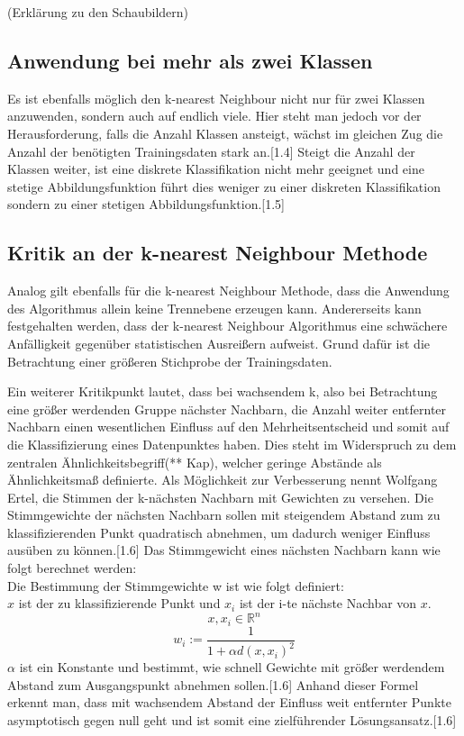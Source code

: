 \documentclass[a4paper]{scrartcl}
\begin{document}
\begin{multicols}{2}
                (Erklärung zu den Schaubildern)
                        
            \subsection{Anwendung bei mehr als zwei Klassen}
                Es ist ebenfalls möglich den k-nearest Neighbour nicht nur für zwei Klassen anzuwenden, sondern auch auf endlich viele. Hier steht man jedoch vor der Herausforderung, falls die Anzahl Klassen ansteigt, wächst im gleichen Zug die Anzahl der benötigten Trainingsdaten stark an.[1.4]
                Steigt die Anzahl der Klassen weiter, ist eine diskrete Klassifikation nicht mehr geeignet und eine stetige Abbildungsfunktion   führt dies weniger zu einer diskreten Klassifikation sondern zu einer stetigen Abbildungsfunktion.[1.5]
                
            \subsection{Kritik an der k-nearest Neighbour Methode}
                Analog gilt ebenfalls für die k-nearest Neighbour Methode, dass die Anwendung des Algorithmus allein keine Trennebene erzeugen kann.
                Andererseits kann festgehalten werden, dass der k-nearest Neighbour Algorithmus eine schwächere Anfälligkeit gegenüber statistischen Ausreißern aufweist. Grund dafür ist die Betrachtung einer größeren Stichprobe der Trainingsdaten.
                        
                Ein weiterer Kritikpunkt lautet, dass bei wachsendem k, also bei Betrachtung eine größer werdenden Gruppe nächster Nachbarn, die Anzahl weiter entfernter Nachbarn einen wesentlichen Einfluss auf den Mehrheitsentscheid und somit auf die Klassifizierung eines Datenpunktes haben. Dies steht im Widerspruch zu dem zentralen Ähnlichkeitsbegriff(** Kap), welcher geringe Abstände als Ähnlichkeitsmaß definierte.
                Als Möglichkeit zur Verbesserung nennt Wolfgang Ertel, die Stimmen der k-nächsten Nachbarn mit Gewichten zu versehen. Die Stimmgewichte der nächsten Nachbarn sollen mit steigendem Abstand zum zu klassifizierenden Punkt quadratisch abnehmen, um dadurch weniger Einfluss ausüben zu können.[1.6]
                Das Stimmgewicht eines nächsten Nachbarn kann wie folgt berechnet werden:\\
                        
                Die Bestimmung der Stimmgewichte w ist wie folgt definiert:\\
                $x$ ist der zu klassifizierende Punkt und $x_i$ ist der i-te nächste Nachbar von $x$.
                $$
                    x,x_i \in \mathbb{R}^n
                $$
                $$
                    w_i:=\frac{1}{1+\alpha d(x,x_i)^2}
                $$
                $\alpha$ ist ein Konstante und bestimmt, wie schnell Gewichte mit größer werdendem Abstand zum Ausgangspunkt abnehmen sollen.[1.6] Anhand dieser Formel erkennt man, dass mit wachsendem Abstand der Einfluss weit entfernter Punkte asymptotisch gegen null geht und ist somit eine zielführender Lösungsansatz.[1.6]

\end{multicols}
\end{document}

